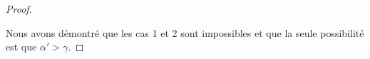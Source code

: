\documentclass[a4paper,12pt]{article}
\begin{document}
\begin{proof}
\begin{enumerate}
\end{enumerate}

Nous avons démontré que les cas 1 et 2 sont impossibles et que la seule possibilité est que $\alpha' > \gamma$.
\end{proof}
\end{document}
